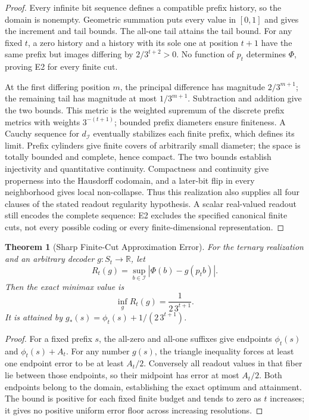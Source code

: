 \documentclass[11pt,a4paper]{article}
\theoremstyle{plain}
\newtheorem{theorem}{Theorem}[section]
\theoremstyle{definition}
\theoremstyle{remark}
\begin{document}
\begin{proof}
Every infinite bit sequence defines a compatible prefix history, so the domain is nonempty. Geometric summation puts every value in $[0,1]$ and gives the increment and tail bounds. The all-one tail attains the tail bound. For any fixed $t$, a zero history and a history with its sole one at position $t+1$ have the same prefix but images differing by $2/3^{t+2}>0$. No function of $p_t$ determines $\Phi$, proving E2 for every finite cut.

At the first differing position $m$, the principal difference has magnitude $2/3^{m+1}$; the remaining tail has magnitude at most $1/3^{m+1}$. Subtraction and addition give the two bounds. This metric is the weighted supremum of the discrete prefix metrics with weights $3^{-(t+1)}$; bounded prefix diameters ensure finiteness. A Cauchy sequence for $d_{\mathcal I}$ eventually stabilizes each finite prefix, which defines its limit. Prefix cylinders give finite covers of arbitrarily small diameter; the space is totally bounded and complete, hence compact. The two bounds establish injectivity and quantitative continuity. Compactness and continuity give properness into the Hausdorff codomain, and a later-bit flip in every neighborhood gives local non-collapse. Thus this realization also supplies all four clauses of the stated readout regularity hypothesis. A scalar real-valued readout still encodes the complete sequence: E2 excludes the specified canonical finite cuts, not every possible coding or every finite-dimensional representation.
\end{proof}

\begin{theorem}[Sharp Finite-Cut Approximation Error]\label{thm:finite-cut-minimax}
For the ternary realization and an arbitrary decoder $g:S_t\to\mathbb R$, let
\[
R_t(g)=\sup_{b\in\mathcal I}|\Phi(b)-g(p_tb)|.
\]
Then the exact minimax value is
\[
\inf_g R_t(g)=\frac{1}{2\,3^{t+1}}.
\]
It is attained by $g_\ast(s)=\phi_t(s)+1/(2\,3^{t+1})$.
\end{theorem}

\begin{proof}
For a fixed prefix $s$, the all-zero and all-one suffixes give endpoints $\phi_t(s)$ and $\phi_t(s)+A_t$. For any number $g(s)$, the triangle inequality forces at least one endpoint error to be at least $A_t/2$. Conversely all readout values in that fiber lie between those endpoints, so their midpoint has error at most $A_t/2$. Both endpoints belong to the domain, establishing the exact optimum and attainment. The bound is positive for each fixed finite budget and tends to zero as $t$ increases; it gives no positive uniform error floor across increasing resolutions.
\end{proof}
\end{document}
